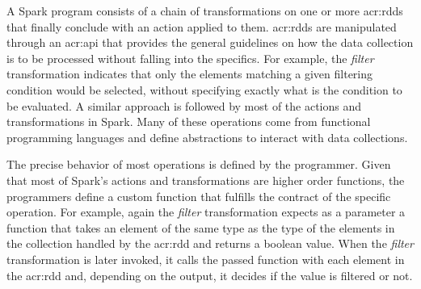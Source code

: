 A Spark program consists of a chain of transformations on one or more \acrshort{acr:rdd}s that finally conclude with an action applied to them. \acrshort{acr:rdd}s are manipulated through an \acrshort{acr:api} that provides the general guidelines on how the data collection is to be processed without falling into the specifics. For example, the \textit{filter} transformation indicates that only the elements matching a given filtering condition would be selected, without specifying exactly what is the condition to be evaluated. A similar approach is followed by most of the actions and transformations in Spark. Many of these operations come from functional programming languages and define abstractions to interact with data collections.

The precise behavior of most operations is defined by the programmer. Given that most of Spark's actions and transformations are higher order functions, the programmers define a custom function that fulfills the contract of the specific operation. For example, again the \textit{filter} transformation expects as a parameter a function that takes an element of the same type as the type of the elements in the collection handled by the \acrshort{acr:rdd} and returns a boolean value. When the \textit{filter} transformation is later invoked, it calls the passed function with each element in the \acrshort{acr:rdd} and, depending on the output, it decides if the value is filtered or not.


%	
%	
%	
%	

